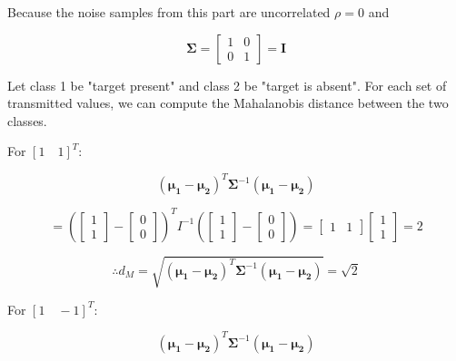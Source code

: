 \documentclass[fleqn]{article}
\begin{document}
\begin{enumerate}
\begin{enumerate}
			Because the noise samples from this part are uncorrelated $\rho = 0$ and
			
			\begin{equation*}
				\mathbf{\Sigma} = \begin{bmatrix}
					1 & 0 \\
					0 & 1
				\end{bmatrix} = \mathbf{I}
			\end{equation*}
			
			Let class 1 be "target present" and class 2 be "target is absent". For each set of transmitted values, we can compute the Mahalanobis distance between the two classes.
			
			For $[1 \quad 1]^T$:
			
			\begin{equation*}
				(\mathbf{\mu_1} - \mathbf{\mu_2})^T\mathbf{\Sigma}^{-1}(\mathbf{\mu_1} - \mathbf{\mu_2})
			\end{equation*}
			
			\begin{equation*}
				= \left(\begin{bmatrix} 1 \\ 1 \end{bmatrix} - \begin{bmatrix} 0 \\ 0 \end{bmatrix}\right)^TI^{-1}\left(\begin{bmatrix} 1 \\ 1 \end{bmatrix} - \begin{bmatrix} 0 \\ 0 \end{bmatrix}\right) = \begin{bmatrix} 1 & 1 \end{bmatrix}\begin{bmatrix} 1 \\ 1 \end{bmatrix} = 2
			\end{equation*}
			
			\begin{equation*}
				\therefore d_M = \sqrt{(\mathbf{\mu_1} - \mathbf{\mu_2})^T\mathbf{\Sigma}^{-1}(\mathbf{\mu_1} - \mathbf{\mu_2})} = \sqrt{2}
			\end{equation*}
			
			For $[1 \quad -1]^T$:
			
			\begin{equation*}
				(\mathbf{\mu_1} - \mathbf{\mu_2})^T\mathbf{\Sigma}^{-1}(\mathbf{\mu_1} - \mathbf{\mu_2})
			\end{equation*}
			

\end{enumerate}
\end{enumerate}
\end{document}

